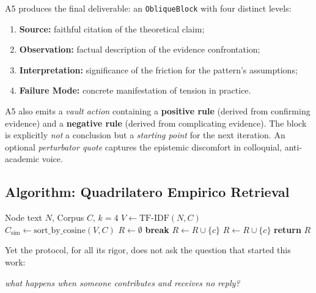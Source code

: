 \documentclass[10pt,twocolumn]{article}
\begin{document}
A5 produces the final deliverable: an \texttt{ObliqueBlock} with four distinct levels:
\begin{enumerate}
    \item \textbf{Source:} faithful citation of the theoretical claim;
    \item \textbf{Observation:} factual description of the evidence confrontation;
    \item \textbf{Interpretation:} significance of the friction for the pattern's assumptions;
    \item \textbf{Failure Mode:} concrete manifestation of tension in practice.
\end{enumerate}
A5 also emits a \emph{vault action} containing a \textbf{positive rule} (derived from confirming evidence) and a \textbf{negative rule} (derived from complicating evidence). The block is explicitly \emph{not} a conclusion but a \emph{starting point} for the next iteration. An optional \emph{perturbator quote} captures the epistemic discomfort in colloquial, anti-academic voice.

\subsection{Algorithm: Quadrilatero Empirico Retrieval}

\begin{algorithm}[H]
\caption{Balanced Corpus Retrieval}
\label{alg:quadrilatero}
\begin{algorithmic}[1]
\Require Node text $N$, Corpus $C$, $k=4$
\State $V \gets \text{TF-IDF}(N, C)$
\State $C_{\text{sim}} \gets \text{sort\_by\_cosine}(V, C)$
\State $R \gets \emptyset$
        \State \textbf{break}
    \EndIf
            \State $R \gets R \cup \{c\}$
            \State $R \gets R \cup \{c\}$
        \EndIf
    \EndIf
\EndFor
\State \textbf{return} $R$
\end{algorithmic}
\end{algorithm}

\vspace{1.5em}

{\centering\itshape\small\textcolor{headinggray}{Yet the protocol, for all its rigor, does not ask the question that started this work:\par}
\vspace{0.5em}
{\itshape\small\textcolor{headinggray}{what happens when someone contributes and receives no reply?}\par}
\vspace{1.5em}
\par}
\end{document}

